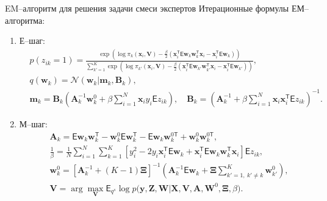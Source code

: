 \documentclass[10pt,pdf,hyperref={unicode}]{beamer}
\begin{document}
\begin{frame}{EM--алгоритм для решения задачи смеси экспертов}
\justifying
Итерационные формулы ЕМ--алгоритма:
	\begin{enumerate}
		\item Е--шаг: 
			\begin{equation*}
				\begin{aligned}
					&p\left(z_{ik} = 1\right) = \frac{\exp\left(\log\pi_{k}\left(\textbf{x}_{i}, \textbf{V}\right) - \frac{\beta}{2}\left(\textbf{x}_{i}^{\mathsf{T}}\mathsf{E}\textbf{w}_{k}\textbf{w}_{k}^{\mathsf{T}}\textbf{x}_{i} - \textbf{x}_{i}^{\mathsf{T}}\mathsf{E}\textbf{w}_{k}\right)\right)}{\sum_{k'=1}^{K}\exp\left(\log\pi_{k'}\left(\textbf{x}_{i}, \textbf{V}\right) - \frac{\beta}{2}\left(\textbf{x}_{i}^{\mathsf{T}}\mathsf{E}\textbf{w}_{k'}\textbf{w}_{k'}^{\mathsf{T}}\textbf{x}_{i} - \textbf{x}_{i}^{\mathsf{T}}\mathsf{E}\textbf{w}_{k'}\right) \right)},\\
					&q(\textbf{w}_k) = \mathcal{N}(\textbf{w}_k|\textbf{m}_k, \textbf{B}_k),\\
					&\mathbf{m}_{k} = \mathbf{B}_{k}\left(\mathbf{A}_{k}^{-1}\mathbf{w}_{k}^{0}+\beta\sum_{i=1}^{N}\mathbf{x}_{i}y_{i}\mathsf{E}z_{ik}\right), \quad
					\mathbf{B}_{k} = \left(\mathbf{A}_{k}^{-1}+\beta\sum_{i=1}^{N}\mathbf{x}_{i}\mathbf{x}_{i}^{\mathsf{T}}\mathsf{E}z_{ik}\right)^{-1} .
				\end{aligned}
			\end{equation*}
		\item М--шаг: 
			\begin{equation*}
				\begin{aligned}
					&\textbf{A}_{k} = \mathsf{E}\textbf{w}_{k}\textbf{w}_{k}^{\mathsf{T}} - \textbf{w}_{k}^{0}\mathsf{E}\textbf{w}_{k}^{\mathsf{T}} - \mathsf{E}\textbf{w}_{k}\textbf{w}_{k}^{0\mathsf{T}} + \textbf{w}_{k}^{0}\textbf{w}_{k}^{0\mathsf{T}}, \\
					 &\frac{1}{\beta}=\frac{1}{N}\sum_{i=1}^{N}\sum_{k=1}^{K}\left[y_{i}^{2}-2y_{i}\textbf{x}_{i}^{\mathsf{T}}\mathsf{E}\textbf{w}_{k} + \textbf{x}_{i}^{\mathsf{T}}\mathsf{E}\textbf{w}_{k}\textbf{w}_{k}^{\mathsf{T}}\textbf{x}_{i}\right]\mathsf{E}z_{ik},\\
					&\textbf{w}_{k}^{0} =\left[\textbf{A}_{k}^{-1}+\left(K-1\right)\bm{\Xi}\right]^{-1}\left(\textbf{A}^{-1}_{k}\mathsf{E}\textbf{w}_{k}+\bm{\Xi}\sum_{k'=1,~k'\not=k}^{K}\textbf{w}_{k'}^{0}\right),\\
					&\textbf{V}= \arg\max_{\textbf{V}} \mathsf{E}_{q^{s}}\log p\bigr(\mathbf{y}, \textbf{Z},\mathbf{W}|\mathbf{X}, \mathbf{V}, \textbf{A}, \textbf{W}^{0}, \bm{\Xi}, \beta\bigr).
				\end{aligned}
			\end{equation*}
	\end{enumerate}
\end{frame}
\end{document}
